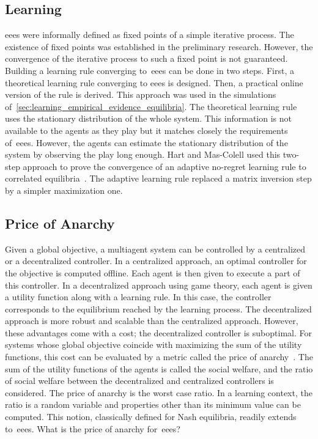 \subsection{Learning}
\Acp{eee} were informally defined as fixed points of a simple iterative process.
The existence of fixed points was established in the preliminary research.
However, the convergence of the iterative process to such a fixed point is not guaranteed.
Building a learning rule converging to~\acp{eee} can be done in two steps.
First, a theoretical learning rule converging to \acp{eee} is designed.
Then, a practical online version of the rule is derived.
This approach was used in the simulations of~\cref{sec:learning_empirical_evidence_equilibria}.
The theoretical learning rule uses the stationary distribution of the whole system.
This information is not available to the agents as they play but it matches closely the requirements of~\acp{eee}.
However, the agents can estimate the stationary distribution of the system by observing the play long enough.
Hart and Mas-Colell used this two-step approach to prove the convergence of an adaptive no-regret learning rule to correlated equilibria~\cite{hart_mas-colell:2001}.
The adaptive learning rule replaced a matrix inversion step by a simpler maximization one.

\subsection{Price of Anarchy}
Given a global objective, a multiagent system can be controlled by a centralized or a decentralized controller.
In a centralized approach, an optimal controller for the objective is computed offline.
Each agent is then given to execute a part of this controller.
In a decentralized approach using game theory, each agent is given a utility function along with a learning rule.
In this case, the controller corresponds to the equilibrium reached by the learning process.
The decentralized approach is more robust and scalable than the centralized approach.
However, these advantages come with a cost; the decentralized controller is suboptimal.
For systems whose global objective coincide with maximizing the sum of the utility functions, this cost can be evaluated by a metric called the price of anarchy~\cite{koutsoupias_papadimitriou:1999}.
The sum of the utility functions of the agents is called the social welfare, and the ratio of social welfare between the decentralized and centralized controllers is considered.
The price of anarchy is the worst case ratio.
In a learning context, the ratio is a random variable and properties other than its minimum value can be computed.
This notion, classically defined for Nash equilibria, readily extends to~\acp{eee}.
What is the price of anarchy for~\acp{eee}?

